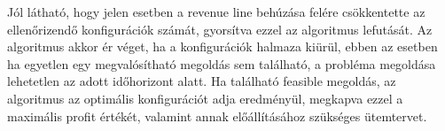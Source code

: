 Jól látható, hogy jelen esetben a revenue line behúzása felére csökkentette az ellenőrizendő konfigurációk számát, gyorsítva ezzel az algoritmus lefutását.
Az algoritmus akkor ér véget, ha a konfigurációk halmaza kiürül, ebben az esetben ha egyetlen egy megvalósítható megoldás sem található, a probléma megoldása lehetetlen az adott időhorizont alatt.
Ha található feasible megoldás, az algoritmus az optimális konfigurációt adja eredményül, megkapva ezzel a maximális profit értékét, valamint annak előállításához szükséges ütemtervet.